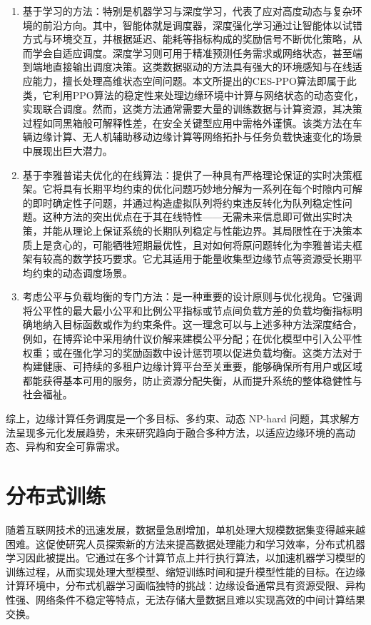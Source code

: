 \begin{enumerate}[topsep = 0 pt, itemsep= 0 pt, parsep=0pt, partopsep=0pt, leftmargin=0pt, itemindent=48pt, labelsep=0pt, listparindent=24pt, label=（\arabic*）]
    \item 基于学习的方法\cite{9253665,8657791}：特别是机器学习与深度学习，代表了应对高度动态与复杂环境的前沿方向。其中，智能体就是调度器，深度强化学习通过让智能体以试错方式与环境交互，并根据延迟、能耗等指标构成的奖励信号不断优化策略，从而学会自适应调度。深度学习则可用于精准预测任务需求或网络状态，甚至端到端地直接输出调度决策。这类数据驱动的方法具有强大的环境感知与在线适应能力，擅长处理高维状态空间问题。本文所提出的CES-PPO算法即属于此类，它利用PPO算法的稳定性来处理边缘环境中计算与网络状态的动态变化，实现联合调度。然而，这类方法通常需要大量的训练数据与计算资源，其决策过程如同黑箱般可解释性差，在安全关键型应用中需格外谨慎。该类方法在车辆边缘计算、无人机辅助移动边缘计算等网络拓扑与任务负载快速变化的场景中展现出巨大潜力。
    \item 基于李雅普诺夫优化的在线算法\cite{8638582,9239321}：提供了一种具有严格理论保证的实时决策框架。它将具有长期平均约束的优化问题巧妙地分解为一系列在每个时隙内可解的即时确定性子问题，并通过构造虚拟队列将约束违反转化为队列稳定性问题。这种方法的突出优点在于其在线特性——无需未来信息即可做出实时决策，并能从理论上保证系统的长期队列稳定与性能边界。其局限性在于决策本质上是贪心的，可能牺牲短期最优性，且对如何将原问题转化为李雅普诺夫框架有较高的数学技巧要求。它尤其适用于能量收集型边缘节点等资源受长期平均约束的动态调度场景。
    \item 考虑公平与负载均衡的专门方法\cite{9316512,8657791}：是一种重要的设计原则与优化视角。它强调将公平性的最大最小公平和比例公平指标或节点间负载方差的负载均衡指标明确地纳入目标函数或作为约束条件。这一理念可以与上述多种方法深度结合，例如，在博弈论中采用纳什议价解来建模公平分配；在优化模型中引入公平性权重；或在强化学习的奖励函数中设计惩罚项以促进负载均衡。这类方法对于构建健康、可持续的多租户边缘计算平台至关重要，能够确保所有用户或区域都能获得基本可用的服务，防止资源分配失衡，从而提升系统的整体稳健性与社会福祉。
\end{enumerate}

综上，边缘计算任务调度是一个多目标、多约束、动态 NP-hard 问题，其求解方法呈现多元化发展趋势，未来研究趋向于融合多种方法，以适应边缘环境的高动态、异构和安全可靠需求。

\section{分布式训练}
随着互联网技术的迅速发展，数据量急剧增加，单机处理大规模数据集变得越来越困难。这促使研究人员探索新的方法来提高数据处理能力和学习效率，分布式机器学习因此被提出。它通过在多个计算节点上并行执行算法，以加速机器学习模型的训练过程，从而实现处理大型模型、缩短训练时间和提升模型性能的目标。在边缘计算环境中，分布式机器学习面临独特的挑战：边缘设备通常具有资源受限、异构性强、网络条件不稳定等特点，无法存储大量数据且难以实现高效的中间计算结果交换。

